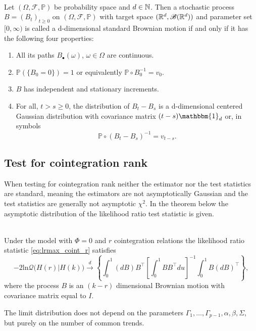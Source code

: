 \begin{defi}\phantom{}\\
    Let $(\Omega, \mathscr{F}, \mathbb{P})$ be probability space and $d\in \mathbb{N}$. Then a stochastic process $B=(B_t)_{t\geq0}$ on $(\Omega, \mathscr{F}, \mathbb{P})$ with target space $(\mathbb{R}^d,\mathscr{B}(\mathbb{R}^d))$ and parameter set $[0,\infty)$ is called a d-dimensional standard Brownian motion if and only if it has the following four properties:
    

\begin{enumerate}
     \item All its paths $B_\bullet(\omega)$, $\omega\in\Omega$ are continuous.
     \item $\mathbb{P}(\{B_0=0\})=1$ or equivalently $\mathbb{P}\circ B_0^{-1}=v_0$.
     \item $B$ has independent and stationary increments.        
     \item  For all, $t > s \geq 0 $, the distribution of $B_t-B_s$ is a d-dimensional centered Gaussian distribution with covariance matrix $(t-s) \mathbbm{1}_d$ or, in symbols 
     \begin{equation*}
         \mathbb{P}\circ (B_t-B_s)^{-1}=v_{t-s}.
     \end{equation*}
\end{enumerate}
\end{defi}


\subsection{Test for cointegration rank}
When testing for cointegration rank neither the estimator nor the test statistics are standard, meaning the estimators are not asymptotically Gaussian and the test statistics are generally not asymptotic $\chi^2$. In the theorem below the asymptotic distribution of the likelihood ratio test statistic is given.

\begin{thm}\phantom\\
    Under the model with $\Phi=0$ and $r$ cointegration relations the likelihood ratio statistic \eqref{eq:lrmax_coint_r} satisfies
    \begin{equation*}
        -2 \text{ln}\mathcal{Q} \big( H(r)|H(k) \big) \overset{d}{\rightarrow} \left\{ \int_0^1 (dB)B^{\top} \left[\int_0^1 BB^\top du \right]^{-1} \int_0^1 B(dB)^\top \right\},
    \end{equation*}
    where the process $B$ is an $(k-r)$ dimensional Brownian motion with covariance matrix equal to $I.$
    \label{thm:asymptotic_distribution}
\end{thm}
\noindent The limit distribution does not depend on the parameters $\Gamma_1,\ldots,\Gamma_{p-1},\alpha,\beta,\Sigma$, but purely on the number of common trends.

